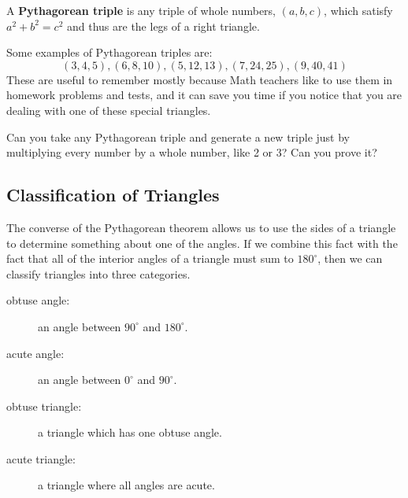 \begin{definition}
  A \textbf{Pythagorean triple} is any triple of whole numbers,
  \((a,b,c)\), which satisfy \(a^{2} + b^{2} = c^{2}\) and thus are
  the legs of a right triangle.
\end{definition}

\begin{example}
  Some examples of Pythagorean triples are:
  \[
    (3,4,5), (6,8,10), (5,12,13), (7,24,25), (9,40,41)
  \]
  These are useful to remember mostly because Math teachers like to
  use them in homework problems and tests, and it can save you time if
  you notice that you are dealing with one of these special triangles.
\end{example}

\begin{exercise}
  Can you take any Pythagorean triple and generate a new triple just
  by multiplying every number by a whole number, like 2 or 3? Can you
  prove it?

\end{exercise}

\newpage

\subsection{Classification of Triangles}%
\label{sub:classification-triangles}

The converse of the Pythagorean theorem allows us to use the sides of
a triangle to determine something about one of the angles. If we
combine this fact with the fact that all of the interior angles of a
triangle must sum to \(180^{\circ}\), then we can classify triangles
into three categories.

\begin{definition}
  \begin{description}
  \item[obtuse angle: ] an angle between \(90^{\circ}\) and \(180^{\circ}\).
  \item[acute angle: ] an angle between \(0^{\circ}\) and \(90^{\circ}\).
  \item[obtuse triangle: ] a triangle which has one obtuse angle.
  \item[acute triangle: ] a triangle where all angles are acute.
  \end{description}
\end{definition}

